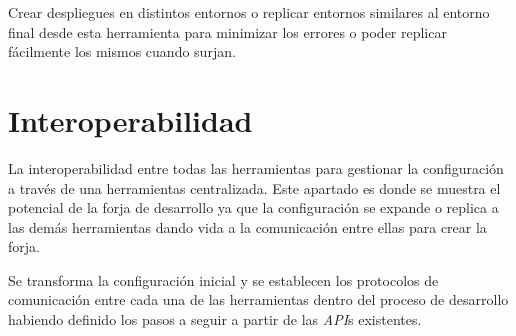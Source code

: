 \par Crear despliegues en distintos entornos o replicar entornos similares al entorno final desde esta herramienta para minimizar los errores o poder replicar fácilmente los mismos cuando surjan.


\section{Interoperabilidad}
\label{sec:interoperabilidad}

\par La interoperabilidad entre todas las herramientas para gestionar la configuración a través de una herramientas centralizada. Este apartado es donde se muestra el potencial de la forja de desarrollo ya que la configuración se expande o replica a las demás herramientas dando vida a la comunicación entre ellas para crear la forja.

\par Se transforma la configuración inicial y se establecen los protocolos de comunicación entre cada una de las herramientas dentro del proceso de desarrollo habiendo definido los pasos a seguir a partir de las \emph{API}s existentes.

